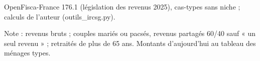 OpenFisca-France 176.1 (législation des revenus 2025), cas-types sans niche ; calculs de l'auteur (outils\_ircsg.py).\par Note : revenus bruts ; couples mariés ou pacsés, revenus partagés 60/40 sauf « un seul revenu » ; retraités de plus de 65 ans. Montants d'aujourd'hui au tableau des ménages types.

